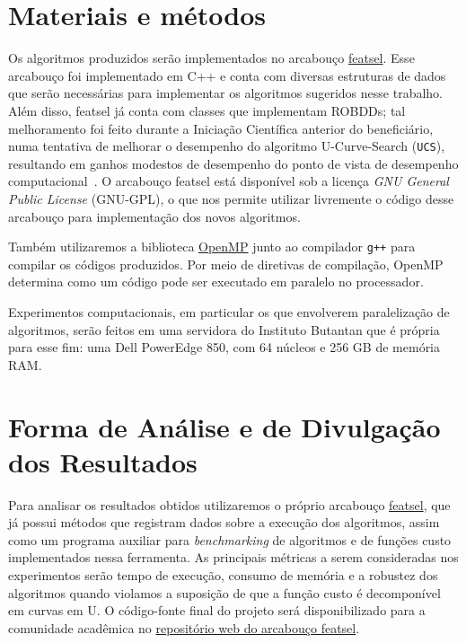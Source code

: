 \documentclass[12pt]{article}
\begin{document}
\section{Materiais e métodos}
Os algoritmos produzidos serão implementados no arcabouço \href{https://github.com/msreis/featsel}{featsel}. Esse arcabouço foi implementado em C++ e conta com diversas estruturas de dados que serão necessárias para implementar os
algoritmos sugeridos nesse trabalho. Além disso, featsel já conta com classes que implementam ROBDDs; tal melhoramento foi feito durante a Iniciação Científica anterior do beneficiário, numa tentativa de melhorar o desempenho do algoritmo U-Curve-Search ({\tt UCS}), resultando em ganhos modestos de desempenho do ponto de vista de desempenho computacional~\cite{ucsrobdd ic}. O arcabouço featsel está disponível sob a licença \textit{GNU General Public License} (GNU-GPL), o que nos permite utilizar livremente o código desse arcabouço para implementação dos novos algoritmos. 

Também utilizaremos a biblioteca \href{http://www.openmp.org/}{OpenMP} junto ao compilador {\tt g++} para compilar os códigos produzidos. Por meio de diretivas de compilação, OpenMP determina como um código pode ser executado em paralelo no processador.

Experimentos computacionais, em particular os que envolverem paralelização de algoritmos, serão feitos em uma servidora do Instituto Butantan que é própria para esse fim: uma Dell PowerEdge 850, com 64 núcleos e 256 GB de memória RAM.


\section{Forma de Análise e de Divulgação dos Resultados}

Para analisar os resultados obtidos utilizaremos o próprio arcabouço \href{https://github.com/msreis/featsel}{featsel}, que já possui métodos que registram dados sobre a execução dos algoritmos, assim como um programa auxiliar para {\em benchmarking} de algoritmos e de funções custo implementados nessa ferramenta. As principais métricas a serem consideradas nos experimentos serão tempo de execução, consumo de memória e a robustez dos algoritmos quando violamos a suposição de que a função custo é decomponível em curvas em U. O código-fonte final do projeto será disponibilizado para a comunidade acadêmica no \href{https://github.com/msreis/featsel}{repositório web do arcabouço featsel}.
\end{document}
